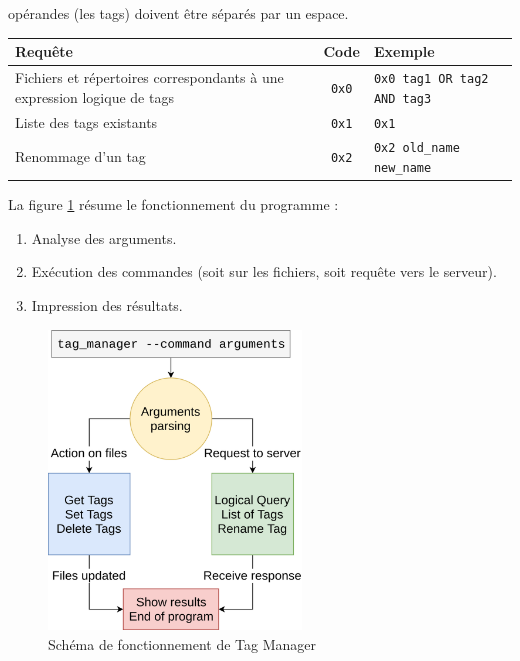 opérandes (les tags) doivent être séparés par un espace.
\begin{center}
    \begin{tabular}{|p{7cm}|c|p{6cm}|} \hline
        \textbf{Requête} & \textbf{Code} & \textbf{Exemple} \\ \hline
        Fichiers et répertoires correspondants à une expression logique de tags & \texttt{0x0} & 
            \texttt{0x0 tag1 OR tag2 AND tag3} \\ \hline
        Liste des tags existants & \texttt{0x1} & \texttt{0x1} \\ \hline
        Renommage d'un tag & \texttt{0x2} & \texttt{0x2 old_name new_name} \\ \hline
    \end{tabular}
    \label{tag_manager_sockets_protocol}
\end{center}
La figure \ref{tag_manager_schema} résume le fonctionnement du programme : 
\begin{enumerate}
    \item Analyse des arguments.
    \item Exécution des commandes (soit sur les fichiers, soit requête vers le serveur).
    \item Impression des résultats.
\end{enumerate}
\begin{figure}
    \begin{center}
        \includegraphics[width=0.6\textwidth]{images/tag_manager.png}
    \end{center}
    \caption{Schéma de fonctionnement de Tag Manager}
    \label{tag_manager_schema}
\end{figure}

